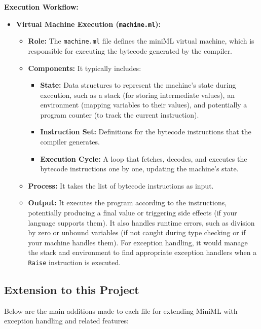 \documentclass[a4paper,12pt]{article}
\begin{document}
\textbf{Execution Workflow:}

\begin{itemize}[left=0.5cm]
    \item \textbf{Virtual Machine Execution (\texttt{machine.ml}):}
    \begin{itemize}[left=0.5cm]
        \item \textbf{Role:} The \texttt{machine.ml} file defines the miniML virtual machine, which is responsible for executing the bytecode generated by the compiler.
        \item \textbf{Components:} It typically includes:
        \begin{itemize}[left=0.5cm]
            \item \textbf{State:} Data structures to represent the machine's state during execution, such as a stack (for storing intermediate values), an environment (mapping variables to their values), and potentially a program counter (to track the current instruction).
            \item \textbf{Instruction Set:} Definitions for the bytecode instructions that the compiler generates.
            \item \textbf{Execution Cycle:} A loop that fetches, decodes, and executes the bytecode instructions one by one, updating the machine's state.
        \end{itemize}
        \item \textbf{Process:} It takes the list of bytecode instructions as input.
        \item \textbf{Output:} It executes the program according to the instructions, potentially producing a final value or triggering side effects (if your language supports them). It also handles runtime errors, such as division by zero or unbound variables (if not caught during type checking or if your machine handles them). For exception handling, it would manage the stack and environment to find appropriate exception handlers when a \texttt{Raise} instruction is executed.
    \end{itemize}
\end{itemize}

\subsection{Extension to this Project}

Below are the main additions made to each file for extending MiniML with exception handling and related features:
\end{document}
